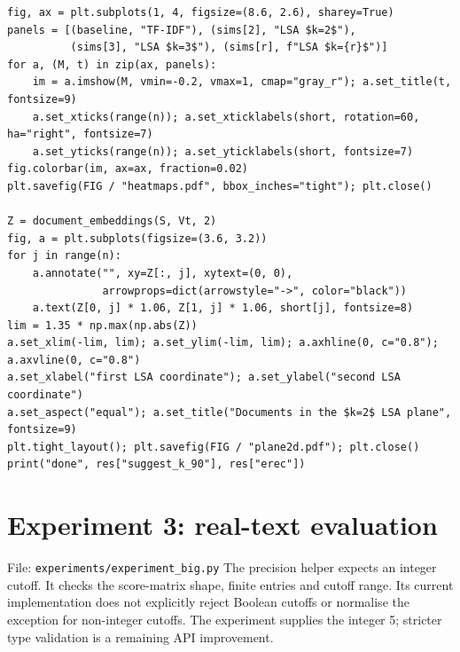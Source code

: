 \documentclass[12pt,a4paper]{report}
\theoremstyle{plain}
\theoremstyle{definition}
\theoremstyle{remark}
\theoremstyle{definition}
\begin{document}
\begin{lstlisting}
fig, ax = plt.subplots(1, 4, figsize=(8.6, 2.6), sharey=True)
panels = [(baseline, "TF-IDF"), (sims[2], "LSA $k=2$"),
          (sims[3], "LSA $k=3$"), (sims[r], f"LSA $k={r}$")]
for a, (M, t) in zip(ax, panels):
    im = a.imshow(M, vmin=-0.2, vmax=1, cmap="gray_r"); a.set_title(t, fontsize=9)
    a.set_xticks(range(n)); a.set_xticklabels(short, rotation=60, ha="right", fontsize=7)
    a.set_yticks(range(n)); a.set_yticklabels(short, fontsize=7)
fig.colorbar(im, ax=ax, fraction=0.02)
plt.savefig(FIG / "heatmaps.pdf", bbox_inches="tight"); plt.close()

Z = document_embeddings(S, Vt, 2)
fig, a = plt.subplots(figsize=(3.6, 3.2))
for j in range(n):
    a.annotate("", xy=Z[:, j], xytext=(0, 0),
               arrowprops=dict(arrowstyle="->", color="black"))
    a.text(Z[0, j] * 1.06, Z[1, j] * 1.06, short[j], fontsize=8)
lim = 1.35 * np.max(np.abs(Z))
a.set_xlim(-lim, lim); a.set_ylim(-lim, lim); a.axhline(0, c="0.8"); a.axvline(0, c="0.8")
a.set_xlabel("first LSA coordinate"); a.set_ylabel("second LSA coordinate")
a.set_aspect("equal"); a.set_title("Documents in the $k=2$ LSA plane", fontsize=9)
plt.tight_layout(); plt.savefig(FIG / "plane2d.pdf"); plt.close()
print("done", res["suggest_k_90"], res["erec"])
\end{lstlisting}

\section{Experiment 3: real-text evaluation}
\noindent File: \texttt{experiments/experiment\_big.py}
The precision helper expects an integer cutoff. It checks the score-matrix shape, finite entries and cutoff range. Its current implementation does not explicitly reject Boolean cutoffs or normalise the exception for non-integer cutoffs. The experiment supplies the integer 5; stricter type validation is a remaining API improvement.
\end{document}
